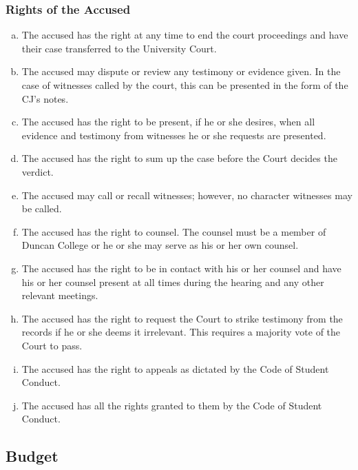\documentclass[USletter,12pt]{article}
\begin{document}
\begin{enumerate}[(a)]
\subsubsection{Rights of the Accused}
\begin{enumerate}[(a)]
\item The accused has the right at any time to end the court proceedings and have their case transferred to the University Court.
\item The accused may dispute or review any testimony or evidence given.  In the case of witnesses called by the court, this can be presented in the form of the CJ's notes.
\item The accused has the right to be present, if he or she desires, when all evidence and testimony from witnesses he or she requests are presented.
\item The accused has the right to sum up the case before the Court decides the verdict.
\item The accused may call or recall witnesses; however, no character witnesses may be called.
\item The accused has the right to counsel.  The counsel must be a member of Duncan College or he or she may serve as his or her own counsel.
\item The accused has the right to be in contact with his or her counsel and have his or her counsel present at all times during the hearing and any other relevant meetings.
\item The accused has the right to request the Court to strike testimony from the records if he or she deems it irrelevant.  This requires a majority vote of the Court to pass.
\item The accused has the right to appeals as dictated by the Code of Student Conduct.
\item The accused has all the rights granted to them by the Code of Student Conduct.
\end{enumerate}


\subsection{Budget}



\end{enumerate}
\end{document}
